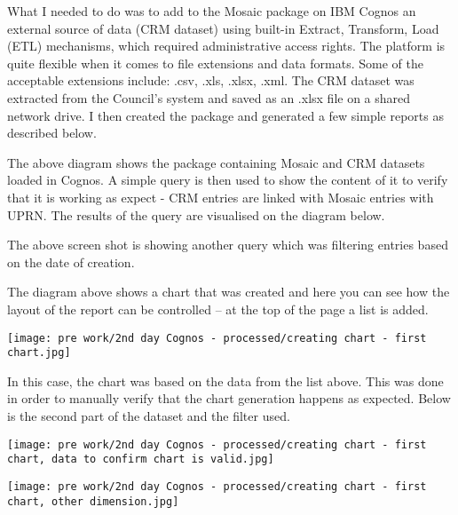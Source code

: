 What I needed to do was to add to the Mosaic package on IBM Cognos an external source of data (CRM dataset) using built-in Extract, Transform, Load (ETL) mechanisms, which required administrative access rights. The platform is quite flexible when it comes to file extensions and data formats. Some of the acceptable extensions include: .csv, .xls, .xlsx, .xml. The CRM dataset was extracted from the Council's system and saved as an .xlsx file on a shared network drive. I then created the package and generated a few simple reports as described below.

The above diagram shows the package containing Mosaic and CRM datasets loaded in Cognos. A simple query is then used to show the content of it to verify that it is working as expect - CRM entries are linked with Mosaic entries with UPRN. The results of the query are visualised on the diagram below.

The above screen shot is showing another query which was filtering entries based on the date of creation.

The diagram above shows a chart that was created and here you can see how the layout of the report can be controlled – at the top of the page a list is added.



\begin{center}
  \texttt{[image: pre work/2nd day Cognos - processed/creating chart - first chart.jpg]}
  \label{normal_case}
\end{center}

In this case, the chart was based on the data from the list above. This was done in order to manually verify that the chart generation happens as expected. Below is the second part of the dataset and the filter used.

\begin{center}
  \texttt{[image: pre work/2nd day Cognos - processed/creating chart - first chart, data to confirm chart is valid.jpg]}
  \label{normal_case}
\end{center}


\begin{center}
  \texttt{[image: pre work/2nd day Cognos - processed/creating chart - first chart, other dimension.jpg]}
  \label{normal_case}
\end{center}



